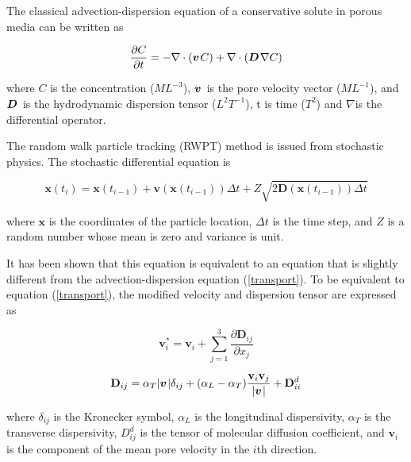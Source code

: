 The classical advection-dispersion equation of a conservative solute in porous media can be written as \cite{jB79}

\begin{equation}\label{transport}
\frac{\partial C}{\partial t} = -\nabla\cdot(\mio{v}{}{}C)+\nabla\cdot(\mio{D}{}{} \nabla C)
\end{equation}

where $C$ is the concentration ($ML^{-3}$), $\mbox{${\mbox{\boldmath${v}$\unboldmath}}^{\:\!}$}$ is the pore velocity vector ($ML^{-1}$), and $\mbox{${\mbox{\boldmath${D}$\unboldmath}}^{\:\!}$}$ is the hydrodynamic dispersion tensor ($L^2T^{-1}$), t is time ($T^{2}$) and $ \nabla $is the differential operator.


The random walk particle tracking (RWPT) method is issued from stochastic physics. The stochastic differential equation is \cite{Ito:51}

\begin{equation}\label{StochasticDifferentialEquation}
\mathbf{x} (t_{i}) = \mathbf{x} (t_{i-1}) + \mathbf{v} (\mathbf{x} (t_{i-1})) \Delta t + Z \sqrt {2\mathbf{D} (\mathbf{x} (t_{i-1})) \Delta t}
\end{equation}

where $\mathbf{x}$ is the coordinates of the particle location, $\Delta t$ is the time step, and $Z$ is a random number whose mean is zero and variance is unit.

It has been shown that this equation is equivalent to an equation that is slightly different from the advection-dispersion equation (\ref{transport}). To be equivalent to equation (\ref{transport}), the modified velocity \cite{wK86} and  dispersion tensor \cite{jB79} are expressed as

\begin{equation}\label{ModifiedVelocity}
\mathbf{v}_i^* = \mathbf{v}_i + \sum_{j=1}^{3}\frac{\partial \mathbf{D} _{ij}}{\partial x _j}
\end{equation}

\begin{equation}\label{DispersionTensor}
\mathbf{D} _{ij} = \alpha _T |\mio{v}{}{}|\delta _{ij} + (\alpha _L - \alpha _T)\frac {\mathbf{v}_i \mathbf{v}_j}{|\mio{v}{}{}|} + \mathbf{D}^d _{ii}
\end{equation}

where $\delta _{ij}$ is the Kronecker symbol, $\alpha _L$ is the longitudinal dispersivity, $\alpha _T$ is the transverse dispersivity, $D^d _{ij}$ is the tensor of molecular diffusion coefficient, and $\mathbf{v}_i$ is the component of the mean pore velocity in the $i$th direction.

